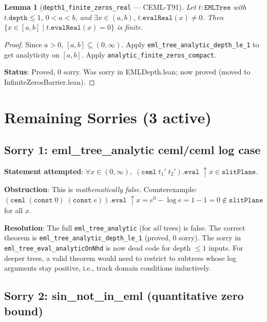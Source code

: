 \documentclass[12pt]{article}
\newtheorem{lemma}[theorem]{Lemma}
\theoremstyle{definition}
\begin{document}
\begin{lemma}[\texttt{depth1\_finite\_zeros\_real} — CEML-T91]
Let $t : \texttt{EMLTree}$ with $t.\texttt{depth} \leq 1$, $0 < a < b$,
and $\exists x \in (a,b),\, t.\texttt{evalReal}(x) \neq 0$.
Then $\{x \in [a,b] \mid t.\texttt{evalReal}(x) = 0\}$ is finite.
\end{lemma}
\begin{proof}
Since $a > 0$, $[a,b] \subseteq (0,\infty)$.
Apply \texttt{eml\_tree\_analytic\_depth\_le\_1} to get analyticity on $[a,b]$.
Apply \texttt{analytic\_finite\_zeros\_compact}.

\textbf{Status}: \textcolor{proved}{Proved, 0 sorry. Was sorry in EMLDepth.lean; now proved (moved to InfiniteZerosBarrier.lean).}
\end{proof}

\section{Remaining Sorries (3 active)}

\subsection{Sorry 1: eml\_tree\_analytic ceml/ceml log case}

\textbf{Statement attempted}: $\forall x \in (0,\infty),\;
  (\texttt{ceml}\;t_1'\;t_2').\texttt{eval}\;\uparrow x \in \texttt{slitPlane}$.

\textbf{Obstruction}: This is \emph{mathematically false}.
Counterexample: $(\texttt{ceml}\;(\texttt{const}\;0)\;(\texttt{const}\;e)).\texttt{eval}\;\uparrow x
= e^0 - \log e = 1 - 1 = 0 \notin \texttt{slitPlane}$ for all $x$.

\textbf{Resolution}: The full \texttt{eml\_tree\_analytic} (for \emph{all} trees) is false.
The correct theorem is \texttt{eml\_tree\_analytic\_depth\_le\_1} (proved, 0 sorry).
The sorry in \texttt{eml\_tree\_eval\_analyticOnNhd} is now dead code for depth $\leq 1$ inputs.
For deeper trees, a valid theorem would need to restrict to subtrees whose log arguments
stay positive, i.e., track domain conditions inductively.

\subsection{Sorry 2: sin\_not\_in\_eml (quantitative zero bound)}
\end{document}
